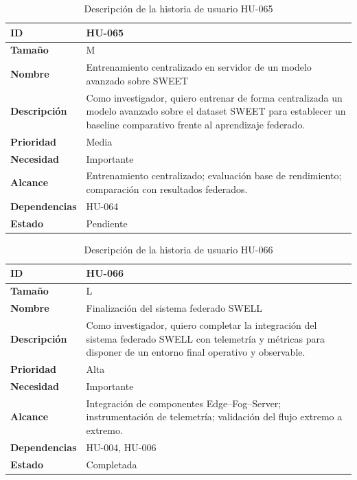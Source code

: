 \documentclass{report}
\begin{document}
\begin{table}[H]
\centering
\caption{Descripción de la historia de usuario HU-065}
\label{tab:hu065}
\begin{tabular}{|l|p{12cm}|}
\hline
\textbf{ID} & HU-065 \\ \hline
\textbf{Tamaño} & M \\ \hline
\textbf{Nombre} & Entrenamiento centralizado en servidor de un modelo avanzado sobre SWEET \\ \hline
\textbf{Descripción} &
Como investigador, quiero entrenar de forma centralizada un modelo avanzado sobre el dataset SWEET para establecer un baseline comparativo frente al aprendizaje federado. \\ \hline
\textbf{Prioridad} & Media \\ \hline
\textbf{Necesidad} & Importante \\ \hline
\textbf{Alcance} &
Entrenamiento centralizado; evaluación base de rendimiento; comparación con resultados federados. \\ \hline
\textbf{Dependencias} & HU-064 \\ \hline
\textbf{Estado} & Pendiente \\ \hline
\end{tabular}
\end{table}


\begin{table}[H]
\centering
\caption{Descripción de la historia de usuario HU-066}
\label{tab:hu066}
\begin{tabular}{|l|p{12cm}|}
\hline
\textbf{ID} & HU-066 \\ \hline
\textbf{Tamaño} & L \\ \hline
\textbf{Nombre} & Finalización del sistema federado SWELL \\ \hline
\textbf{Descripción} &
Como investigador, quiero completar la integración del sistema federado SWELL con telemetría y métricas para disponer de un entorno final operativo y observable. \\ \hline
\textbf{Prioridad} & Alta \\ \hline
\textbf{Necesidad} & Importante \\ \hline
\textbf{Alcance} &
Integración de componentes Edge--Fog--Server; instrumentación de telemetría; validación del flujo extremo a extremo. \\ \hline
\textbf{Dependencias} & HU-004, HU-006 \\ \hline
\textbf{Estado} & Completada \\ \hline
\end{tabular}
\end{table}
\end{document}

